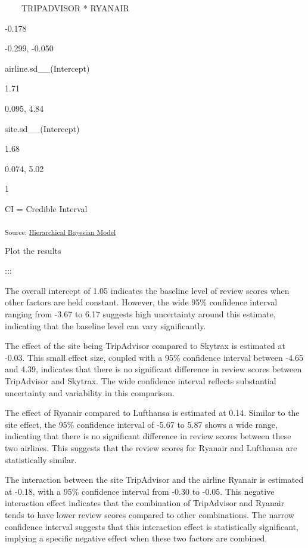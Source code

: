 \documentclass[
]{agujournal2019}
\begin{document}
~~~~TRIPADVISOR * RYANAIR

-0.178

-0.299, -0.050

airline.sd\_\_(Intercept)

1.71

0.095, 4.84

site.sd\_\_(Intercept)

1.68

0.074, 5.02

{1}

CI = Credible Interval

\textsubscript{Source:
\href{https://chrglez.github.io/hierarchical_bayesian_airlines/notebooks/hierarchical-bayesian-model-preview.html\#ed1ee33f-b8ce-4ae3-b07a-78ed66be5581}{Hierarchical
Bayesian Model}}

Plot the results

:::

The overall intercept of 1.05 indicates the baseline level of review
scores when other factors are held constant. However, the wide 95\%
confidence interval ranging from -3.67 to 6.17 suggests high uncertainty
around this estimate, indicating that the baseline level can vary
significantly.

The effect of the site being TripAdvisor compared to Skytrax is
estimated at -0.03. This small effect size, coupled with a 95\%
confidence interval between -4.65 and 4.39, indicates that there is no
significant difference in review scores between TripAdvisor and Skytrax.
The wide confidence interval reflects substantial uncertainty and
variability in this comparison.

The effect of Ryanair compared to Lufthansa is estimated at 0.14.
Similar to the site effect, the 95\% confidence interval of -5.67 to
5.87 shows a wide range, indicating that there is no significant
difference in review scores between these two airlines. This suggests
that the review scores for Ryanair and Lufthansa are statistically
similar.

The interaction between the site TripAdvisor and the airline Ryanair is
estimated at -0.18, with a 95\% confidence interval from -0.30 to -0.05.
This negative interaction effect indicates that the combination of
TripAdvisor and Ryanair tends to have lower review scores compared to
other combinations. The narrow confidence interval suggests that this
interaction effect is statistically significant, implying a specific
negative effect when these two factors are combined.
\end{document}
